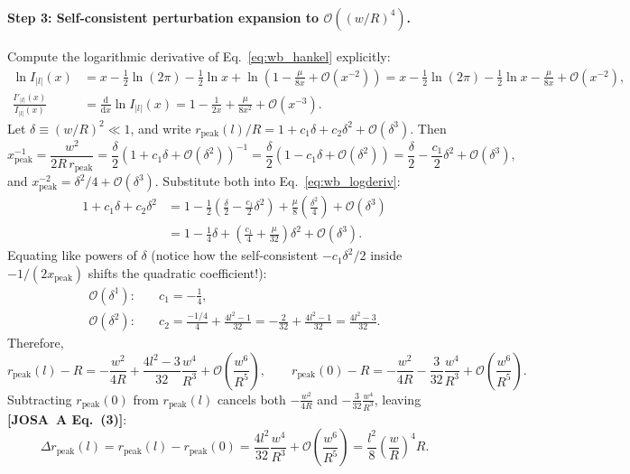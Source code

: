 \documentclass[10pt,letterpaper]{article}
\newcommand{\abs}[1]{\lvert #1 \rvert}
\newcommand{\dd}{\mathrm{d}}
\newcommand{\josa}[1]{\textbf{[JOSA~A Eq.~(#1)]}}
\numberwithin{equation}{section}
\begin{document}
\paragraph*{Step 3: Self-consistent perturbation expansion to $\mathcal{O}((w/R)^4)$.}
Compute the logarithmic derivative of Eq.~\eqref{eq:wb_hankel} explicitly:
\begin{align}
  \ln I_{\abs{l}}(x) &= x - \frac{1}{2}\ln(2\pi) - \frac{1}{2}\ln x + \ln\!\left(1 - \frac{\mu}{8x} + \mathcal{O}(x^{-2})\right) = x - \frac{1}{2}\ln(2\pi) - \frac{1}{2}\ln x - \frac{\mu}{8x} + \mathcal{O}(x^{-2}), \\
  \frac{I'_{\abs{l}}(x)}{I_{\abs{l}}(x)} &= \frac{\dd}{\dd x}\ln I_{\abs{l}}(x) = 1 - \frac{1}{2x} + \frac{\mu}{8x^2} + \mathcal{O}(x^{-3}).
  \label{eq:wb_logderiv}
\end{align}
Let $\delta \equiv (w/R)^2 \ll 1$, and write $r_{\mathrm{peak}}(l)/R = 1 + c_1\delta + c_2\delta^2 + \mathcal{O}(\delta^3)$. Then
\begin{equation}
  x_{\mathrm{peak}}^{-1} = \frac{w^2}{2R\,r_{\mathrm{peak}}} = \frac{\delta}{2}\left(1 + c_1\delta + \mathcal{O}(\delta^2)\right)^{-1} = \frac{\delta}{2}\left(1 - c_1\delta + \mathcal{O}(\delta^2)\right) = \frac{\delta}{2} - \frac{c_1}{2}\delta^2 + \mathcal{O}(\delta^3),
\end{equation}
and $x_{\mathrm{peak}}^{-2} = \delta^2/4 + \mathcal{O}(\delta^3)$. Substitute both into Eq.~\eqref{eq:wb_logderiv}:
\begin{align}
  1 + c_1\delta + c_2\delta^2 &= 1 - \frac{1}{2}\left(\frac{\delta}{2} - \frac{c_1}{2}\delta^2\right) + \frac{\mu}{8}\left(\frac{\delta^2}{4}\right) + \mathcal{O}(\delta^3) \nonumber \\
  &= 1 - \frac{1}{4}\delta + \left(\frac{c_1}{4} + \frac{\mu}{32}\right)\delta^2 + \mathcal{O}(\delta^3).
\end{align}
Equating like powers of $\delta$ (notice how the self-consistent $-c_1\delta^2/2$ inside $-1/(2x_{\mathrm{peak}})$ shifts the quadratic coefficient!):
\begin{align}
  \mathcal{O}(\delta^1): &\quad c_1 = -\frac{1}{4}, \\
  \mathcal{O}(\delta^2): &\quad c_2 = \frac{-1/4}{4} + \frac{4l^2 - 1}{32} = -\frac{2}{32} + \frac{4l^2 - 1}{32} = \frac{4l^2 - 3}{32}.
\end{align}
Therefore,
\begin{equation}
  r_{\mathrm{peak}}(l) - R = -\frac{w^2}{4R} + \frac{4l^2 - 3}{32}\frac{w^4}{R^3} + \mathcal{O}\!\left(\frac{w^6}{R^5}\right), \qquad
  r_{\mathrm{peak}}(0) - R = -\frac{w^2}{4R} - \frac{3}{32}\frac{w^4}{R^3} + \mathcal{O}\!\left(\frac{w^6}{R^5}\right).
\end{equation}
Subtracting $r_{\mathrm{peak}}(0)$ from $r_{\mathrm{peak}}(l)$ cancels both $-\frac{w^2}{4R}$ and $-\frac{3}{32}\frac{w^4}{R^3}$, leaving \josa{3}:
\begin{equation}
  \Delta r_{\mathrm{peak}}(l) = r_{\mathrm{peak}}(l) - r_{\mathrm{peak}}(0) = \frac{4l^2}{32}\frac{w^4}{R^3} + \mathcal{O}\!\left(\frac{w^6}{R^5}\right) = \frac{l^2}{8}\left(\frac{w}{R}\right)^4 R.
\end{equation}
\end{document}
